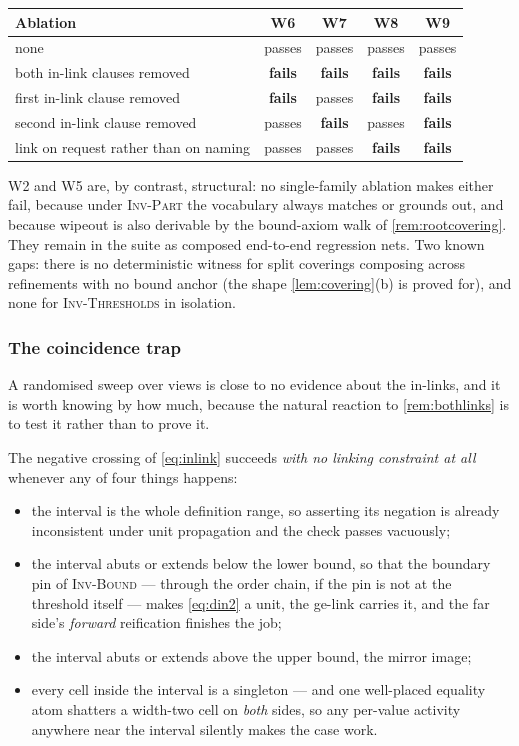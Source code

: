 \documentclass[11pt,a4paper]{article}
\theoremstyle{plain}
\theoremstyle{definition}
\theoremstyle{remark}
\newcommand{\inv}[1]{\textnormal{\textsc{Inv-#1}}}
\newcommand{\invThresholds}{\inv{Thresholds}}
\newcommand{\invPart}{\inv{Part}}
\begin{document}
\begin{center}
\small
\begin{tabular}{@{}lcccc@{}}
\toprule
\textbf{Ablation} & W6 & W7 & W8 & W9 \\
\midrule
none & passes & passes & passes & passes \\
both in-link clauses removed & \textbf{fails} & \textbf{fails} & \textbf{fails} & \textbf{fails} \\
first in-link clause removed & \textbf{fails} & passes & \textbf{fails} & \textbf{fails} \\
second in-link clause removed & passes & \textbf{fails} & passes & \textbf{fails} \\
link on request rather than on naming & passes & passes & \textbf{fails} & \textbf{fails} \\
\bottomrule
\end{tabular}
\end{center}

W2 and W5 are, by contrast, structural: no single-family ablation makes either
fail, because under \invPart{} the vocabulary always matches or grounds out, and
because wipeout is also derivable by the bound-axiom walk of
\cref{rem:rootcovering}.  They remain in the suite as composed end-to-end
regression nets.  Two known gaps: there is no deterministic witness for split
coverings composing across refinements with no bound anchor (the shape
\cref{lem:covering}(b) is proved for), and none for \invThresholds{} in isolation.

\subsubsection*{The coincidence trap}
\label{sec:coincidence}

A randomised sweep over views is close to no evidence about the in-links, and it
is worth knowing by how much, because the natural reaction to
\cref{rem:bothlinks} is to test it rather than to prove it.

The negative crossing of \cref{eq:inlink} succeeds \emph{with no linking constraint
at all} whenever any of four things happens:

\begin{itemize}[itemsep=1pt]
  \item the interval is the whole definition range, so asserting its negation is
    already inconsistent under unit propagation and the check passes vacuously;
  \item the interval abuts or extends below the lower bound, so that the
    boundary pin of \inv{Bound} --- through the order chain, if the pin is not
    at the threshold itself --- makes \cref{eq:din2} a unit, the ge-link carries it,
    and the far side's \emph{forward} reification finishes the job;
  \item the interval abuts or extends above the upper bound, the mirror image;
  \item every cell inside the interval is a singleton --- and one well-placed
    equality atom shatters a width-two cell on \emph{both} sides, so any
    per-value activity anywhere near the interval silently makes the case work.
\end{itemize}
\end{document}
